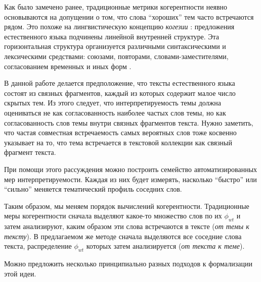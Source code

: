 Как было замечено ранее, традиционные метрики когерентности неявно основываются на допущении о том, что слова ``хороших'' тем часто встречаются рядом. Это похоже на лингвистическую концепцию \textit{когезии} \cite{halliday1976cohesion}: предложения естественного языка подчинены линейной внутренней структуре. Эта горизонтальная структура организуется
различными синтаксическими и лексическими средствами: союзами, повторами, словами-заместителями, согласованием временных и иных форм \cite{kazachenko2009}.

В данной работе делается предположение, что тексты естественного языка состоят из связных фрагментов, каждый из которых содержит малое число скрытых тем. Из этого следует, что интерпретируемость темы должна оцениваться не как согласованность наиболее частых слов темы, но как согласованность слов темы внутри связных фрагментов текста. Нужно заметить, что частая совместная встречаемость самых вероятных слов тоже косвенно указывает на то, что тема встречается в текстовой коллекции как связный фрагмент текста.

При помощи этого рассуждения можно построить семейство автоматизированных мер интерпретируемости. Каждая из них будет измерять, насколько ``быстро'' или ``сильно'' меняется тематический профиль соседних слов.

Таким образом, мы меняем порядок вычислений когерентности. Традиционные меры когерентности сначала выделяют какое-то множество слов по их $\phi_{wt}$ и затем анализируют, каким образом эти слова встречаются в тексте (\emph{от темы к тексту}). В предлагаемом же методе сначала выделяются все соседние слова текста, распределение $\phi_{wt}$ которых затем анализируется (\emph{от текста к теме}).

Можно предложить несколько принципиально разных подходов к формализации этой идеи.





